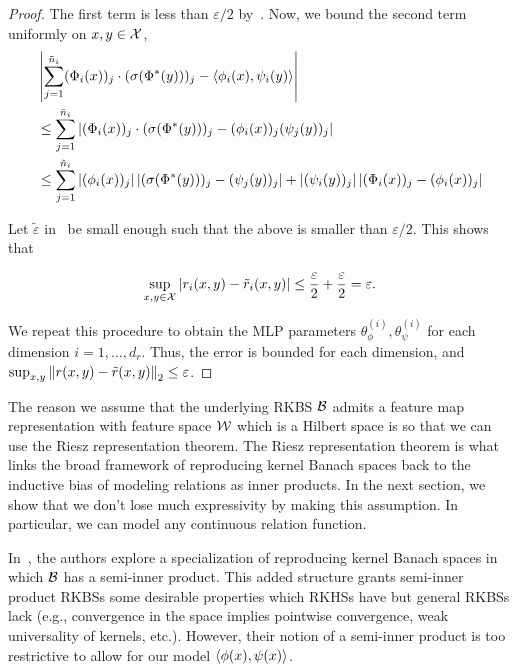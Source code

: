 \begin{proof}
    The first term is less than $\varepsilon / 2$ by~. Now, we bound the second term uniformly on $x,y \in {\mathcal{X}}$,
    \begin{align*}
        &\left\lvert\sum_{j=1}^{\tilde{n}_i} (\Phi_i(x))_j \cdot (\sigma(\Phi^*(y)))_j - \left \langle \phi_i(x), \psi_i(y) \right\rangle\right\rvert \\
        &\leq \sum_{j=1}^{\tilde{n}_i} \left\lvert(\Phi_i(x))_j \cdot (\sigma(\Phi^*(y)))_j - (\phi_i(x))_j(\psi_j(y))_j\right\rvert \\
        &\leq \sum_{j=1}^{\tilde{n}_i} \left\lvert(\phi_i(x))_j\right\rvert \left\lvert(\sigma(\Phi^*(y)))_j - (\psi_j(y))_j\right\rvert + \left\lvert(\psi_i(y))_j\right\rvert \left\lvert(\Phi_i(x))_j - (\phi_i(x))_j\right\rvert\\
    \end{align*}

    Let $\tilde{\varepsilon}$ in~ be small enough such that the above is smaller than $\varepsilon / 2$. This shows that

    \begin{equation*}
        \sup_{x,y \in {\mathcal{X}}} \left\lvert r_i(x,y) - \tilde{r}_i(x,y)\right\rvert \leq \frac{\varepsilon}{2} + \frac{\varepsilon}{2} = \varepsilon.
    \end{equation*}

    We repeat this procedure to obtain the MLP parameters $\theta_\phi^{(i)}, \theta_{\psi}^{(i)}$ for each dimension $i = 1, \ldots, d_r$. Thus, the error is bounded for each dimension, and $\sup_{x,y} \left\lVert r(x, y) - \tilde{r}(x, y)\right\rVert_2 \leq \varepsilon$.
\end{proof}

\begin{remark}
    The reason we assume that the underlying RKBS ${\mathcal{B}}$ admits a feature map representation with feature space ${\mathcal{W}}$ which is a Hilbert space is so that we can use the Riesz representation theorem. The Riesz representation theorem is what links the broad framework of reproducing kernel Banach spaces back to the inductive bias of modeling relations as inner products. In the next section, we show that we don't lose much expressivity by making this assumption. In particular, we can model any continuous relation function.
\end{remark}

\begin{remark}
    In~\citep{zhangReproducingKernel2009}, the authors explore a specialization of reproducing kernel Banach spaces in which ${\mathcal{B}}$ has a semi-inner product. This added structure grants semi-inner product RKBSs some desirable properties which RKHSs have but general RKBSs lack (e.g., convergence in the space implies pointwise convergence, weak universality of kernels, etc.). However, their notion of a semi-inner product is too restrictive to allow for our model $\left \langle \phi(x), \psi(x) \right\rangle$.
\end{remark}

